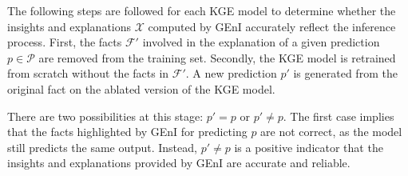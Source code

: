 The following steps are followed for each KGE model to determine whether the insights and explanations $\mathcal{X}$ computed by GEnI accurately reflect the inference process. First, the facts $\mathcal{F}'$ involved in the explanation of a given prediction $p \in \mathcal{P}$ are removed from the training set. Secondly, the KGE model is retrained from scratch without the facts in $\mathcal{F}'$. A new prediction $p'$ is generated from the original fact on the ablated version of the KGE model. 

There are two possibilities at this stage: $p'= p$ or $p' \neq p$. The first case implies that the facts highlighted by GEnI for predicting $p$ are not correct, as the model still predicts the same output. Instead, $p' \neq p$ is a positive indicator that the insights and explanations provided by GEnI are accurate and reliable. 

\begin{table}[t]
\caption{Reliability results on DistMult on WN18RR and TransH on DBpedia50. The number of rules, correlations, and influential facts per experiment are also reported.}\label{tab:reliability_results}
\end{table}

